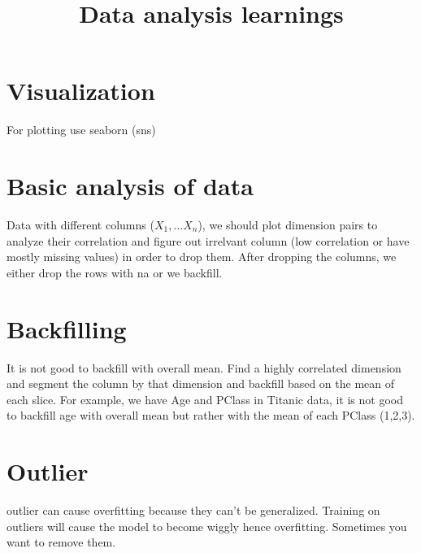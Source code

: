 \documentclass[12pt]{article}
\title{Data analysis learnings}
\begin{document}
	\maketitle

\section{Visualization}
For plotting use seaborn (sns)

\section{Basic analysis of data}
Data with different columns ($X_1, \ldots X_n$), we should plot dimension pairs to analyze their correlation and figure out irrelvant column (low correlation or have mostly missing values) in order to drop them. After dropping the columns,  we either drop the rows with na or we backfill. 

\section{Backfilling}
It is not good to backfill with overall mean. Find a highly correlated dimension and segment the column by that dimension and backfill based on the mean of each slice. For example, we have Age and PClass in Titanic data, it is not good to backfill age with overall mean but rather with the mean of each PClass (1,2,3).

\section{Outlier}
outlier can cause overfitting because they can't be generalized. Training on outliers will cause the model to become wiggly hence overfitting. Sometimes you want to remove them.
\end{document}
